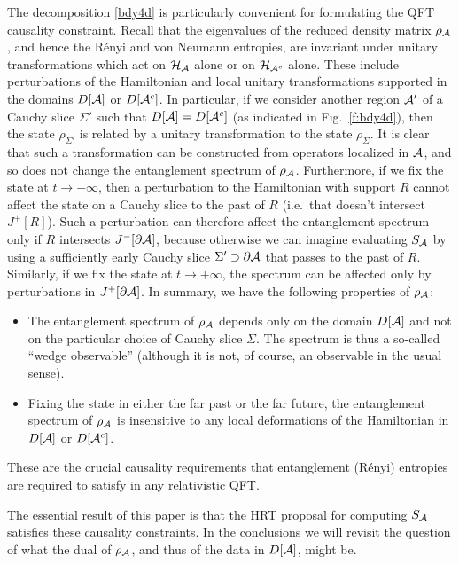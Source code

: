 \documentclass[12pt]{article}
\def\regA{{\cal A}}
\def\regAc{{\cal A}^c}
\def\rhoA{{\rho_{\regA}}}
\def\entsurf{
\partial \regA}
\def\domdA{D[\regA]}
\def\domdAc{D[\regAc]}
\begin{document}
The decomposition \eqref{bdy4d} is particularly convenient for formulating the QFT causality constraint. Recall that the eigenvalues of the reduced density matrix $\rhoA$, and hence the R\'enyi and von Neumann entropies, are invariant under unitary transformations which act on ${\cal H}_{\regA}$ alone or on ${\cal H}_{\regAc}$ alone.  These include perturbations of the Hamiltonian and local unitary transformations supported in the domains $D[\regA]$ or $D[\regAc]$. 
In particular, if we consider another region $\regA'$ of a Cauchy slice $\Sigma'$ such that $D[\regA]=D[\regAc]$ (as indicated in Fig.~\ref{f:bdy4d}), then the state $\rho_{\Sigma'}$ is related by a unitary transformation to the state $\rho_\Sigma$.  It is clear that such a transformation can be constructed from operators localized in $\regA$, and so does not change the entanglement spectrum of $\rhoA$. Furthermore, if we fix the state at $t\to-\infty$, then a perturbation to the Hamiltonian with support $R$ cannot affect the state on a Cauchy slice to the past of $R$ (i.e.\ that doesn't intersect $J^+[R]$). Such a perturbation can therefore affect the entanglement spectrum only if $R$ intersects $J^-[\entsurf]$, because otherwise we can imagine evaluating $S_\regA$ by using a sufficiently early Cauchy slice $\Sigma' \supset \entsurf$ that passes to the past of $R$. Similarly, if we fix the state at $t\to+\infty$, the spectrum can be affected only by perturbations in $J^+[\entsurf]$. In summary, we have the following properties of $\rhoA$: 
%
\begin{itemize}
\item 
The entanglement spectrum of $\rhoA$ depends only on the domain $D[\regA]$ and not on the particular choice of Cauchy slice $\Sigma$. The spectrum is thus a so-called ``wedge observable'' (although it is not, of course, an observable in the usual sense).
\item 
Fixing the state in either the far past or the far future, the entanglement spectrum of $\rhoA$ is insensitive to any local deformations of the Hamiltonian in $\domdA$ or $\domdAc$.
\end{itemize}
%
These are the crucial causality requirements that entanglement (R\'enyi) entropies are required to satisfy in any relativistic QFT.

 The essential result of this paper is that the HRT proposal  for computing $S_{\regA}$ satisfies these causality constraints. In the conclusions we will revisit the question of what the dual of $\rhoA$, and thus of the data in $D[\regA]$, might be. 
\end{document}
